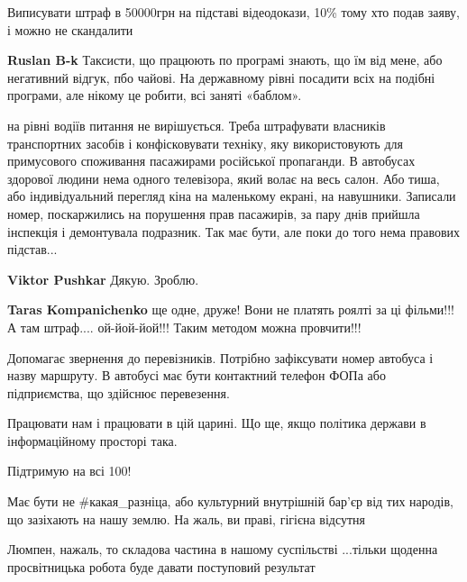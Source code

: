 \begin{itemize}
Виписувати штраф в 50000грн на підставі відеодокази, 10\% тому хто подав заяву,
і можно не скандалити

\begin{itemize} %
\textbf{Ruslan B-k} Таксисти, що працюють по програмі знають, що їм від мене, або негативний відгук, пбо чайові. На державному рівні посадити всіх на подібні програми, але нікому це робити, всі заняті «баблом».
\end{itemize} %


на рівні водіїв питання не вирішується. Треба штрафувати власників транспортних
засобів і конфісковувати техніку, яку використовують для примусового споживання
пасажирами російської пропаганди. В автобусах здорової людини нема одного
телевізора, який волає на весь салон. Або тиша, або індивідуальний перегляд
кіна на маленькому екрані, на навушники. Записали номер, поскаржились на
порушення прав пасажирів, за пару днів прийшла інспекція і демонтувала
подразник. Так має бути, але поки до того нема правових підстав...

\begin{itemize} %
\textbf{Viktor Pushkar} Дякую. Зроблю.

\textbf{Taras Kompanichenko} ще одне, друже! Вони не платять роялті за ці фільми!!! А там штраф.... ой-йой-йой!!! Таким методом можна провчити!!!
\end{itemize} %


Допомагає звернення до перевізників. Потрібно зафіксувати номер автобуса і
назву маршруту. В автобусі має бути контактний телефон ФОПа або підприємства,
що здійснює перевезення.


Працювати нам і працювати в цій царині. Що ще, якщо політика держави в інформаційному просторі така.

Підтримую на всі 100!


Має бути не \#какая\_разніца, або культурний внутрішній бар'єр від тих народів,
що зазіхають на нашу землю. На жаль, ви праві, гігієна відсутня



Люмпен, нажаль, то складова частина в нашому суспільстві ...тільки щоденна
просвітницька робота буде давати поступовий результат


\end{itemize}
